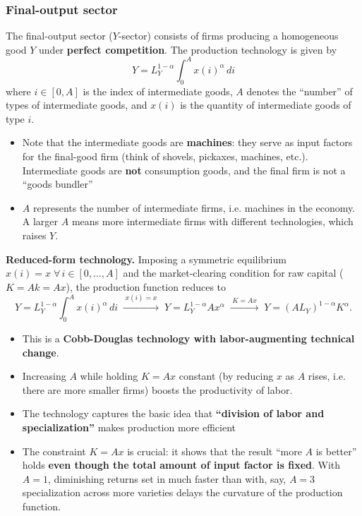 \subsubsection{Final-output sector}

The final-output sector ($Y$-sector) consists of firms producing a homogeneous good $Y$ under \textbf{perfect competition}. The production technology is given by
\[
    Y = L_Y^{1-\alpha} \int_0^A x(i)^\alpha \, di 
\]
where $i \in [0,A]$ is the index of intermediate goods, $A$ denotes the ``number'' of types of intermediate goods, and $x(i)$ is the quantity of intermediate goods of type $i$.

\begin{itemize}
    \item Note that the intermediate goods are \textbf{machines}: they serve as input factors for the final-good firm (think of shovels, pickaxes, machines, etc.). Intermediate goods are \textbf{not} consumption goods, and the final firm is not a ``goods bundler''
    \item $A$ represents the number of intermediate firms, i.e. machines in the economy. A larger $A$ means more intermediate firms with different technologies, which raises $Y$.
\end{itemize}

\noindent \textbf{Reduced-form technology.} Imposing a symmetric equilibrium $x(i) = x \;\forall\, i \in [0,\dots,A]$ and the market-clearing condition for raw capital ($K = Ak = Ax$), the production function reduces to
\[
    Y = L_Y^{1-\alpha} \int_0^A x(i)^\alpha \, di 
    \;\xrightarrow{\;x(i)=x\;} \; 
    Y = L_Y^{1-\alpha} A x^\alpha 
    \;\xrightarrow{\;K=Ax\;} \; 
    Y = (A L_Y)^{1-\alpha} K^\alpha.
\]

\begin{itemize}
    \item This is a \textbf{Cobb-Douglas technology with labor-augmenting technical change}.
    \item Increasing $A$ while holding $K = Ax$ constant (by reducing $x$ as $A$ rises, i.e. there are more smaller firms) boosts the productivity of labor.
    \item The technology captures the basic idea that \textbf{``division of labor and specialization''} makes production more efficient
    \item The constraint $K = Ax$ is crucial: it shows that the result ``more $A$ is better'' holds \textbf{even though the total amount of input factor is fixed}. With $A = 1$, diminishing returns set in much faster than with, say, $A = 3$ specialization across more varieties delays the curvature of the production function.
\end{itemize}

